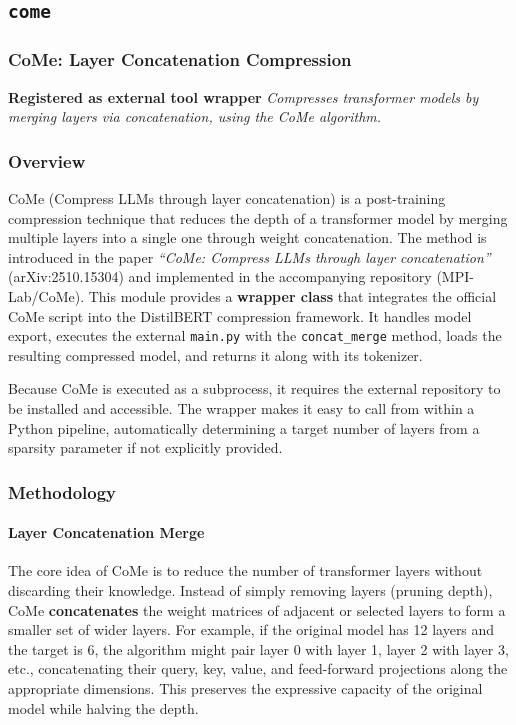 \subsection{\texttt{come}}
\subsubsection*{CoMe: Layer Concatenation Compression}

\textbf{Registered as external tool wrapper}
\textit{Compresses transformer models by merging layers via concatenation, using the CoMe algorithm.}


\subsubsection*{Overview}

CoMe (Compress LLMs through layer concatenation) is a post-training compression technique that reduces the depth of a transformer model by merging multiple layers into a single one through weight concatenation. The method is introduced in the paper \textit{``CoMe: Compress LLMs through layer concatenation''} (arXiv:2510.15304) and implemented in the accompanying repository (MPI-Lab/CoMe). This module provides a \textbf{wrapper class} that integrates the official CoMe script into the DistilBERT compression framework. It handles model export, executes the external \texttt{main.py} with the \texttt{concat\_merge} method, loads the resulting compressed model, and returns it along with its tokenizer.

Because CoMe is executed as a subprocess, it requires the external repository to be installed and accessible. The wrapper makes it easy to call from within a Python pipeline, automatically determining a target number of layers from a sparsity parameter if not explicitly provided.


\subsubsection*{Methodology}

\paragraph{Layer Concatenation Merge}

The core idea of CoMe is to reduce the number of transformer layers without discarding their knowledge. Instead of simply removing layers (pruning depth), CoMe \textbf{concatenates} the weight matrices of adjacent or selected layers to form a smaller set of wider layers. For example, if the original model has 12 layers and the target is 6, the algorithm might pair layer 0 with layer 1, layer 2 with layer 3, etc., concatenating their query, key, value, and feed-forward projections along the appropriate dimensions. This preserves the expressive capacity of the original model while halving the depth.

